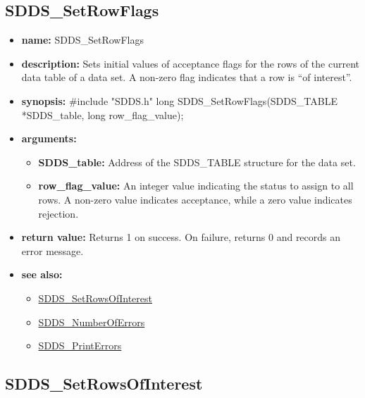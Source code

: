 \documentclass[11pt]{article}
\newcommand{\progref}[1]{\hyperref{SDDS_#1}{{\tt SDDS\_#1} (}{)}{SDDS_#1}}
\begin{document}
\subsection{SDDS\_SetRowFlags}
\label{SDDS_SetRowFlags}

\begin{itemize}
\item {\bf name:}\newline
SDDS\_SetRowFlags
\item {\bf description:}\newline
Sets initial values of acceptance flags for the rows of the current data table of a data set. A non-zero flag indicates that a row is ``of interest''.
\item {\bf synopsis:} \#include "SDDS.h"\newline
long SDDS\_SetRowFlags(SDDS\_TABLE *SDDS\_table, long row\_flag\_value);
\item {\bf arguments:}
\begin{itemize}
\item {\bf SDDS\_table:} Address of the SDDS\_TABLE structure for the data set.
\item {\bf row\_flag\_value:} An integer value indicating the status to assign to all rows. A non-zero value indicates acceptance, while a zero value indicates rejection.
\end{itemize}
\item {\bf return value:}\newline
Returns 1 on success. On failure, returns 0 and records an error message.
\item {\bf see also:}
\begin{itemize}
\item \progref{SetRowsOfInterest}
\item \progref{NumberOfErrors}
\item \progref{PrintErrors}
\end{itemize}
\end{itemize}

\subsection{SDDS\_SetRowsOfInterest}
\label{SDDS_SetRowsOfInterest}
\end{document}
